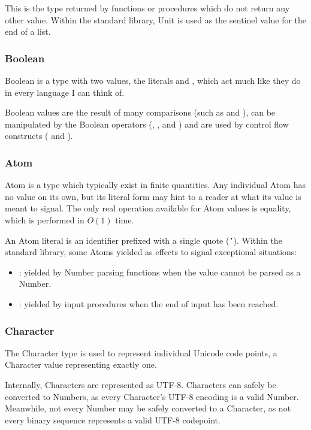 This is the type returned by functions or procedures which do not return
any other value. Within the standard library, Unit is used as the sentinel
value for the end of a list.

\subsubsection{Boolean}

Boolean is a type with two values, the literals  and ,
which act much like they do in every language I can think of.

Boolean values are the result of many comparisons (such as  and
), can be manipulated by the Boolean operators (, ,
and ) and are used by control flow constructs ( and
).

\subsubsection{Atom}

Atom is a type which typically exist in finite quantities. Any individual
Atom has no value on its own, but its literal form may hint to a reader at
what its value is meant to signal. The only real operation available for
Atom values is equality, which is performed in $O(1)$ time.

An Atom literal is an identifier prefixed with a single quote (\texttt{'}).
Within the standard library, some Atoms yielded as effects to signal
exceptional situations:

\begin{itemize}
    \item {}: yielded by Number parsing functions when the value
    cannot be parsed as a Number.
    \item {}: yielded by input procedures when the end of input
    has been reached.
\end{itemize}

\subsubsection{Character}

The Character type is used to represent individual Unicode code points,
a Character value representing exactly one.

Internally, Characters are represented as UTF-8. Characters can safely
be converted to Numbers, as every Character's UTF-8 encoding is a valid
Number. Meanwhile, not every Number may be safely converted to a Character,
as not every binary sequence represents a valid UTF-8 codepoint.

